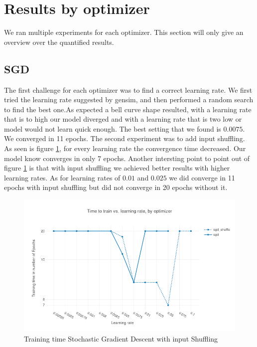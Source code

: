 \section{Results by optimizer}
We ran multiple experiments for each optimizer. This section will only give an overview over the quantified results. 

\subsection{SGD}
The first challenge for each optimizer was to find a correct learning rate. We first tried the learning rate suggested by gensim, and then performed a random search to find the best one.As expected a bell curve shape resulted, with a learning rate that is to high our model diverged and with a learning rate that is two low or model would not learn quick enough. The best setting that we found is $0.0075$. We converged in 11 epochs. The second experiment was to add input shuffling. 
As seen is figure \ref{fig:results_sgd}, for every learning rate the convergence time decreased. Our model know converges in only 7 epochs. Another intersting point to point out of figure \ref{fig:results_sgd} is that with input shuffling we achieved better results with higher learning rates. As for learning rates of $0.01$ and $0.025$ we did converge in 11 epochs with input shuffling but did not converge in 20 epochs without it.

\begin{figure}[h]
    \centering
			\includegraphics[scale=0.45]{images/results_sgd_shuffle} 
    \caption{Training time Stochastic Gradient Descent with input Shuffling}
    \label{fig:results_sgd}
\end{figure}

